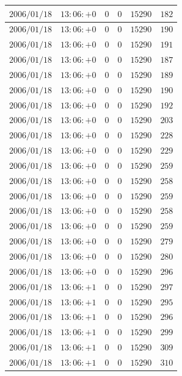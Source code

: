 \documentclass[a4j,papersize,disablejfam,slide,14pt]{jsarticle}
\begin{document}
\begin{description}
\begin{center}
\begin{longtable}{|l|l|l|l|l|l|}
					$2006/01/18$ & $13:06:+0$  & $0$ & $0$ & $15290$ & $182$ \\ \hline
					$2006/01/18$ & $13:06:+0$  & $0$ & $0$ & $15290$ & $190$ \\ \hline
					$2006/01/18$ & $13:06:+0$  & $0$ & $0$ & $15290$ & $191$ \\ \hline
					$2006/01/18$ & $13:06:+0$  & $0$ & $0$ & $15290$ & $187$ \\ \hline
					$2006/01/18$ & $13:06:+0$  & $0$ & $0$ & $15290$ & $189$ \\ \hline
					$2006/01/18$ & $13:06:+0$  & $0$ & $0$ & $15290$ & $190$ \\ \hline
					$2006/01/18$ & $13:06:+0$  & $0$ & $0$ & $15290$ & $192$ \\ \hline
					$2006/01/18$ & $13:06:+0$  & $0$ & $0$ & $15290$ & $203$ \\ \hline
					$2006/01/18$ & $13:06:+0$  & $0$ & $0$ & $15290$ & $228$ \\ \hline
					$2006/01/18$ & $13:06:+0$  & $0$ & $0$ & $15290$ & $229$ \\ \hline
					$2006/01/18$ & $13:06:+0$  & $0$ & $0$ & $15290$ & $259$ \\ \hline
					$2006/01/18$ & $13:06:+0$  & $0$ & $0$ & $15290$ & $258$ \\ \hline
					$2006/01/18$ & $13:06:+0$  & $0$ & $0$ & $15290$ & $259$ \\ \hline
					$2006/01/18$ & $13:06:+0$  & $0$ & $0$ & $15290$ & $258$ \\ \hline
					$2006/01/18$ & $13:06:+0$  & $0$ & $0$ & $15290$ & $259$ \\ \hline
					$2006/01/18$ & $13:06:+0$  & $0$ & $0$ & $15290$ & $279$ \\ \hline
					$2006/01/18$ & $13:06:+0$  & $0$ & $0$ & $15290$ & $280$ \\ \hline
					$2006/01/18$ & $13:06:+0$  & $0$ & $0$ & $15290$ & $296$ \\ \hline
					$2006/01/18$ & $13:06:+1$  & $0$ & $0$ & $15290$ & $297$ \\ \hline
					$2006/01/18$ & $13:06:+1$  & $0$ & $0$ & $15290$ & $295$ \\ \hline
					$2006/01/18$ & $13:06:+1$  & $0$ & $0$ & $15290$ & $296$ \\ \hline
					$2006/01/18$ & $13:06:+1$  & $0$ & $0$ & $15290$ & $299$ \\ \hline
					$2006/01/18$ & $13:06:+1$  & $0$ & $0$ & $15290$ & $309$ \\ \hline
					$2006/01/18$ & $13:06:+1$  & $0$ & $0$ & $15290$ & $310$ \\ \hline

\end{longtable}
\end{center}
\end{description}
\end{document}
